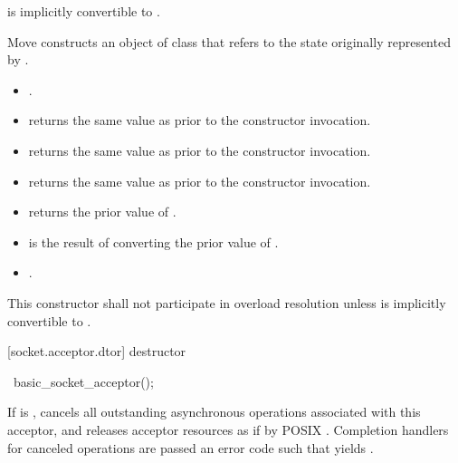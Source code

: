 \begin{itemdescr}
\pnum
\requires {} is implicitly convertible to .

\pnum
\effects Move constructs an object of class  that refers to the state originally represented by .

\pnum
\postconditions
\begin{itemize}
\item
{}.
\item
{} returns the same value as  prior to the constructor invocation.
\item
{} returns the same value as  prior to the constructor invocation.
\item
{} returns the same value as  prior to the constructor invocation.
\item
{} returns the prior value of .
\item
{} is the result of converting the prior value of .
\item
{}.
\end{itemize}

\pnum
\remarks This constructor shall not participate in overload resolution unless  is implicitly convertible to .
\end{itemdescr}



[socket.acceptor.dtor]{ destructor}

\begin{itemdecl}
~basic_socket_acceptor();
\end{itemdecl}

\begin{itemdescr}
\pnum
\effects If  is , cancels all outstanding asynchronous operations associated with this acceptor, and releases acceptor resources as if by POSIX . Completion handlers for canceled operations are passed an error code  such that  yields .
\end{itemdescr}



